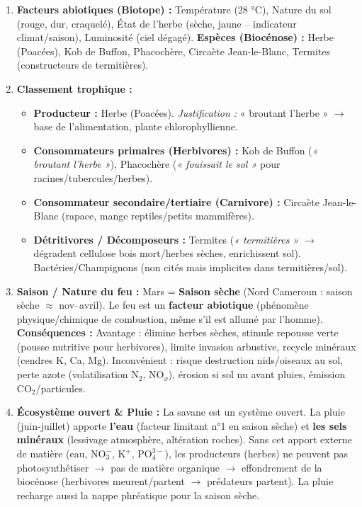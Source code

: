 \documentclass[11pt]{article}
\begin{document}
\begin{corrige}
\begin{enumerate}
    \item \textbf{Facteurs abiotiques (Biotope) :} Température (28 °C), Nature du sol (rouge, dur, craquelé), État de l'herbe (sèche, jaune -- indicateur climat/saison), Luminosité (ciel dégagé). \textbf{Espèces (Biocénose) :} Herbe (Poacées), Kob de Buffon, Phacochère, Circaète Jean-le-Blanc, Termites (constructeurs de termitières).
    \item \textbf{Classement trophique :}
    \begin{itemize}
        \item \textbf{Producteur :} Herbe (Poacées). \emph{Justification :} « broutant l'herbe » $\to$ base de l'alimentation, plante chlorophyllienne.
        \item \textbf{Consommateurs primaires (Herbivores) :} Kob de Buffon (\emph{« broutant l'herbe »}), Phacochère (\emph{« fouissait le sol »} pour racines/tubercules/herbes).
        \item \textbf{Consommateur secondaire/tertiaire (Carnivore) :} Circaète Jean-le-Blanc (rapace, mange reptiles/petits mammifères).
        \item \textbf{Détritivores / Décomposeurs :} Termites (\emph{« termitières »} $\to$ dégradent cellulose bois mort/herbes sèches, enrichissent sol). Bactéries/Champignons (non cités mais implicites dans termitières/sol).
    \end{itemize}
    \item \textbf{Saison / Nature du feu :} Mars = \textbf{Saison sèche} (Nord Cameroun : saison sèche $\approx$ nov--avril). Le feu est un \textbf{facteur abiotique} (phénomène physique/chimique de combustion, même s'il est allumé par l'homme). \textbf{Conséquences :} Avantage : élimine herbes sèches, stimule repousse verte (pousse nutritive pour herbivores), limite invasion arbustive, recycle minéraux (cendres K, Ca, Mg). Inconvénient : risque destruction nids/oiseaux au sol, perte azote (volatilisation N$_2$, NO$_x$), érosion si sol nu avant pluies, émission CO$_2$/particules.
    \item \textbf{Écosystème ouvert \& Pluie :} La savane est un système ouvert. La pluie (juin-juillet) apporte \textbf{l'eau} (facteur limitant n°1 en saison sèche) et \textbf{les sels minéraux} (lessivage atmosphère, altération roches). Sans cet apport externe de matière (eau, $\text{NO}_3^-$, $\text{K}^+$, $\text{PO}_4^{3-}$), les producteurs (herbes) ne peuvent pas photosynthétiser $\to$ pas de matière organique $\to$ effondrement de la biocénose (herbivores meurent/partent $\to$ prédateurs partent). La pluie recharge aussi la nappe phréatique pour la saison sèche.
\end{enumerate}
\end{corrige}
\end{document}
